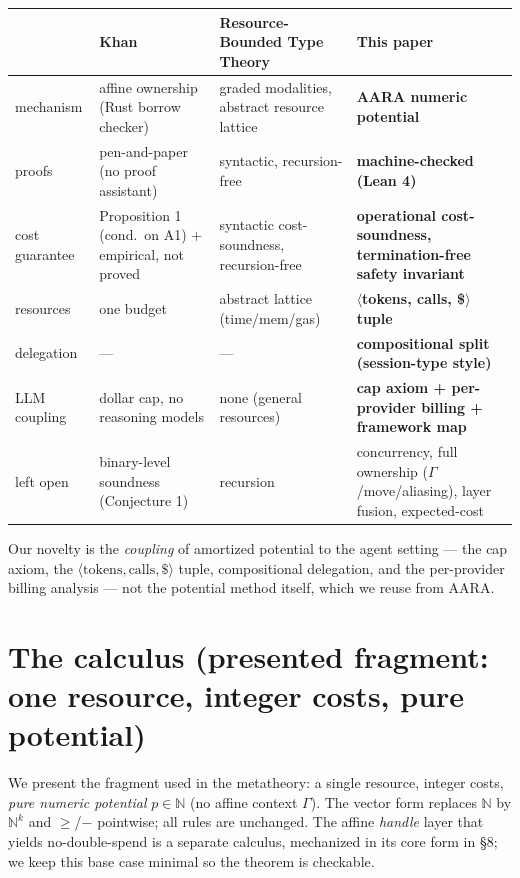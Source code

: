 \documentclass[11pt]{article}
\theoremstyle{plain}
\begin{document}
\begin{center}\footnotesize
\begin{tabular}{@{}R{1.7cm}R{3.4cm}R{3.6cm}R{4.9cm}@{}}
\toprule
 & Khan~\cite{khan2026} & Resource-Bounded Type Theory~\cite{rbtt2025} & \textbf{This paper} \\
\midrule
mechanism & affine ownership (Rust borrow checker) & graded modalities, abstract resource lattice
  & \textbf{AARA numeric potential} \\
proofs & pen-and-paper (no proof assistant) & syntactic, recursion-free
  & \textbf{machine-checked (Lean 4)} \\
cost guarantee & Proposition 1 (cond.\ on A1) + empirical, not proved & syntactic cost-soundness,
  recursion-free & \textbf{operational cost-soundness, termination-free safety invariant} \\
resources & one budget & abstract lattice (time/mem/gas)
  & \boldmath$\langle$\textbf{tokens, calls, \$}$\rangle$ \textbf{tuple} \\
delegation & --- & --- & \textbf{compositional split (session-type style)} \\
LLM coupling & dollar cap, no reasoning models & none (general resources)
  & \textbf{cap axiom + per-provider billing + framework map} \\
left open & binary-level soundness (Conjecture 1) & recursion
  & concurrency, full ownership ($\Gamma$/move/aliasing), layer fusion, expected-cost \\
\bottomrule
\end{tabular}
\end{center}

Our novelty is the \emph{coupling} of amortized potential to the agent setting --- the cap axiom,
the $\langle\text{tokens},\text{calls},\$\rangle$ tuple, compositional delegation, and the
per-provider billing analysis --- not the potential method itself, which we reuse from AARA.

\section{The calculus (presented fragment: one resource, integer costs, pure potential)}

We present the fragment used in the metatheory: a single resource, integer costs, \emph{pure
numeric potential} $p \in \mathbb{N}$ (no affine context $\Gamma$). The vector form replaces
$\mathbb{N}$ by $\mathbb{N}^k$ and $\ge$/$-$ pointwise; all rules are unchanged. The affine
\emph{handle} layer that yields no-double-spend is a separate calculus, mechanized in its core form
in \S8; we keep this base case minimal so the theorem is checkable.
\end{document}
